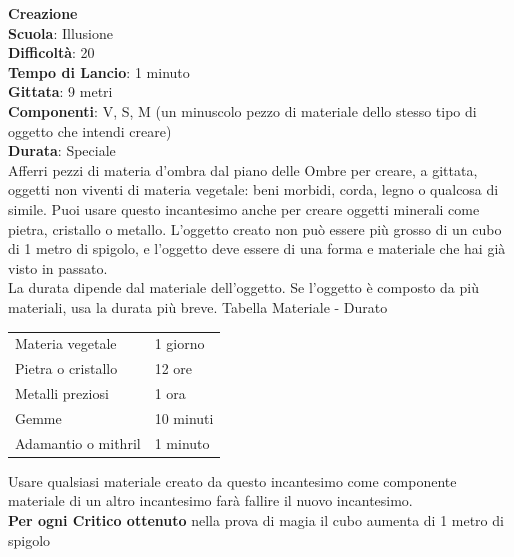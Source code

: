 \begin{multicols}{2}
\medskip\textbf{Creazione}\\
\textbf{Scuola}: Illusione\\
\textbf{Difficoltà}: 20\\
\textbf{Tempo di Lancio}: 1 minuto\\
\textbf{Gittata}: 9 metri\\
\textbf{Componenti}: V, S, M (un minuscolo pezzo di materiale dello stesso tipo di oggetto che intendi creare) \\
\textbf{Durata}: Speciale\\
Afferri pezzi di materia d'ombra dal piano delle Ombre per creare, a gittata, oggetti non viventi di materia vegetale: beni morbidi, corda, legno o qualcosa di simile. Puoi usare questo incantesimo anche per creare oggetti minerali come pietra, cristallo o metallo. L'oggetto creato non può essere più grosso di un cubo di 1 metro di spigolo, e l'oggetto deve essere di una forma e materiale che hai già visto in passato.\\
La durata dipende dal materiale dell'oggetto. Se l'oggetto è composto da più materiali, usa la durata più breve.
\medskip
Tabella Materiale - Durato
\medskip

\begin{tabularx}{0.45\textwidth}{lX}
	\hline 
Materia vegetale &1 giorno\\
Pietra o cristallo &12 ore\\
Metalli preziosi &1 ora\\
Gemme &10 minuti\\
Adamantio o mithril &1 minuto\\
\end{tabularx} 
\medskip

Usare qualsiasi materiale creato da questo incantesimo come componente materiale di un altro incantesimo farà fallire il nuovo incantesimo.\\
\textbf{Per ogni Critico ottenuto} nella prova di magia il cubo aumenta di 1 metro di spigolo


\end{multicols}
